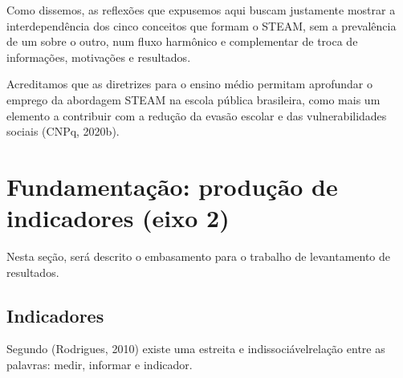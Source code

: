 \documentclass[
12pt,		%
openright,	%
twoside,  %
a4paper,			%
chapter=TITLE,		%
english,			%
french,				%
spanish,			%
brazil				%
]{USPSC-classe/USPSC}
\begin{document}
Como dissemos, as reflex\~oes que expusemos aqui buscam justamente mostrar a interdepend\^encia dos cinco conceitos que formam o STEAM, sem a preval\^encia de um sobre o outro, num fluxo harm\^onico e complementar de troca de informa\c{c}\~oes, motiva\c{c}\~oes e resultados.










\noindent\begin{center}\mbox{\centering{}}\end{center}


Acreditamos que as diretrizes para o ensino m\'edio permitam aprofundar o emprego da abordagem STEAM na escola p\'ublica brasileira, como mais um elemento a contribuir com a redu\c{c}\~ao da evas\~ao escolar e das vulnerabilidades sociais  (CNPq, 2020b).









\section[Fundamenta\c{c}\~ao: produ\c{c}\~ao de indicadores (eixo 2)]{Fundamenta\c{c}\~ao: produ\c{c}\~ao de indicadores (eixo 2)}\label{Fundamenta\c{c}\~ao: produ\c{c}\~ao de indicadores (eixo 2)}
Nesta se\c{c}\~ao, ser\'a descrito o embasamento para o trabalho de levantamento de resultados.









\subsection[Indicadores]{Indicadores}\label{Indicadores}
Segundo (Rodrigues, 2010) existe uma \textquotedbl estreita e indissoci\'avel\textquotedbl  rela\c{c}\~ao entre as palavras: medir, informar e \textquotedbl indicador\textquotedbl .
\end{document}
